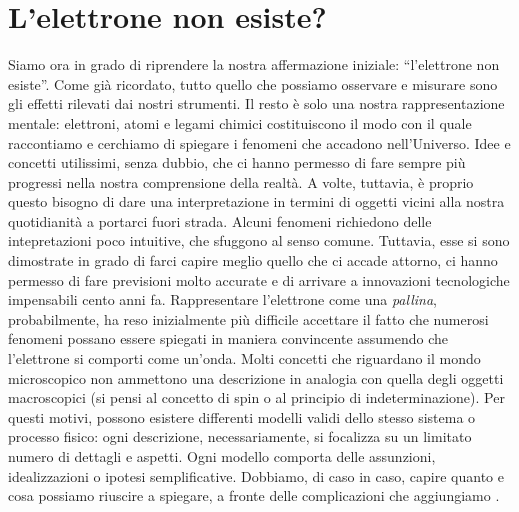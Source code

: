 \section*{L'elettrone non esiste?}
Siamo ora in grado di riprendere la nostra affermazione iniziale: 
``l'elettrone non esiste''. Come già ricordato, tutto quello che possiamo osservare
e misurare sono gli effetti rilevati dai nostri strumenti. 
Il resto è solo una nostra rappresentazione mentale: elettroni, atomi
e legami chimici costituiscono il modo con il quale raccontiamo e cerchiamo di spiegare
i fenomeni che accadono nell'Universo. Idee e concetti utilissimi, senza dubbio, che ci hanno
permesso di fare sempre più progressi nella nostra comprensione della realtà.
A volte, tuttavia, è proprio questo bisogno di dare una interpretazione in termini di oggetti
vicini alla nostra quotidianità a portarci fuori strada. Alcuni fenomeni richiedono delle
intepretazioni poco intuitive, che sfuggono al senso comune. Tuttavia, esse si sono dimostrate
in grado di farci capire meglio quello che ci accade attorno, ci hanno permesso di fare previsioni 
molto accurate e di arrivare a innovazioni tecnologiche impensabili cento anni fa.
Rappresentare l'elettrone come una \emph{pallina}, probabilmente, ha reso inizialmente più difficile 
accettare il fatto che numerosi fenomeni possano essere spiegati in maniera convincente
assumendo che l'elettrone si comporti come un'onda. Molti concetti che riguardano il mondo microscopico
non ammettono una descrizione in analogia con quella degli oggetti macroscopici (si pensi al concetto 
di spin o al principio di indeterminazione).
Per questi motivi, possono esistere differenti modelli validi dello stesso sistema o processo fisico:
ogni descrizione, necessariamente, si focalizza su un limitato numero di dettagli e aspetti. Ogni
modello comporta delle assunzioni, idealizzazioni o ipotesi semplificative. Dobbiamo, di caso in caso,
capire quanto e cosa possiamo riuscire a spiegare, a fronte delle complicazioni che aggiungiamo
\cite{hczhc}.

